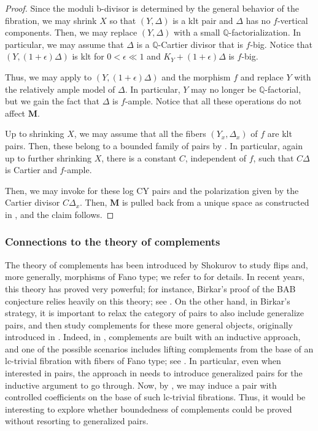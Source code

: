 \documentclass{amsart}
\theoremstyle{definition}
\theoremstyle{remark}
\newcommand\bfM{{\bf M}}
\def\bfM{\mathbf{M}}
\numberwithin{equation}{section}
\begin{document}
\begin{proof}
    Since the moduli b-divisor is determined by the general behavior of the fibration, we may shrink $X$ so that $(Y,\Delta)$ is a klt pair and $\Delta$ has no $f$-vertical components.
    Then, we may replace $(Y,\Delta)$ with a small $\mathbb Q$-factorialization.
    In particular, we may assume that $\Delta$ is a $\mathbb Q$-Cartier divisor that is $f$-big.
    Notice that $(Y,(1+\epsilon)\Delta)$ is klt for $0< \epsilon \ll 1$ and $K_Y+(1+\epsilon)\Delta$ is $f$-big.

    Thus, we may apply \cite{bchm} to $(Y,(1+\epsilon)\Delta)$ and the morphism $f$ and replace $Y$ with the relatively ample model of $\Delta$.
    In particular, $Y$ may no longer be $\mathbb Q$-factorial, but we gain the fact that $\Delta$ is $f$-ample.
    Notice that all these operations do not affect $\bfM$.

    Up to shrinking $X$, we may assume that all the fibers $(Y_x,\Delta_x)$ of $f$ are klt pairs.
    Then, these belong to a bounded family of pairs by \cite{HX15}.
    In particular, again up to further shrinking $X$, there is a constant $C$, independent of $f$, such that  
    $C\Delta$ is Cartier and $f$-ample.

    Then, we may invoke  for these log CY pairs and the polarization given by the Cartier divisor $C\Delta_x$.
    Then, $\bfM$ is pulled back from a unique space as constructed in , and the claim follows.
\end{proof}



\subsubsection{Connections to the theory of complements}
The theory of complements has been introduced by Shokurov to study flips and, more generally, morphisms of Fano type;
we refer to \cite{shokurov20} for details.
In recent years, this theory has proved very powerful;
for instance, Birkar's proof of the BAB conjecture relies heavily on this theory;
see \cite{bab1,bab2}.
On the other hand, in Birkar's strategy, it is important to relax the category of pairs to also include generalize pairs, and then study complements for these more general objects, originally introduced in \cite{BZ16}.
Indeed, in \cite{bab1},
complements are built with an inductive approach, and one of the possible scenarios includes lifting complements from the base of an lc-trivial fibration with fibers of Fano type;
see \cite[\S6.4]{bab1}.
In particular, even when interested in pairs, the approach in \cite{bab1} needs to introduce generalized pairs for the inductive argument to go through.
Now, by , we may induce a pair with controlled coefficients on the base of such lc-trivial fibrations.
Thus, it would be interesting to explore whether boundedness of complements could be proved without resorting to generalized pairs.
\end{document}

